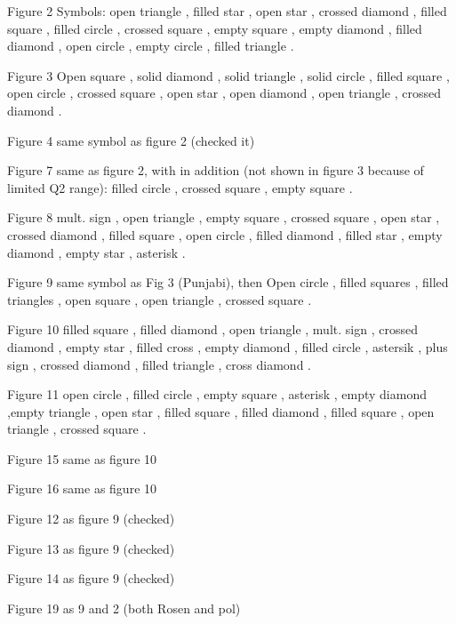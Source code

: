Figure 2
Symbols: open triangle \cite{hand63}, filled star \cite{walker}, 
open star \cite{hanson}, crossed diamond \cite{bartel}, filled square \cite{berger}, filled circle \cite{murphy}, 
crossed square \cite{bork},
empty square \cite{simon}, empty diamond \cite{andivahisA}, filled diamond \cite{litt}, open circle \cite{Price}, 
empty circle \cite{christy}, filled triangle \cite{qattan05}. 

Figure 3
Open square \cite{milbrathA}, solid diamond \cite{pospischil},
 solid triangle \cite{strauch}, solid circle \cite{punjabi05B}, filled square \cite{gayou:2002}, open circle \cite{crawford},
crossed square \cite{paolone:2010}, open star \cite{Jones:2006}, open diamond \cite{hu},  open triangle \cite{Ron:2011}, 
crossed diamond \cite{mac}.

Figure 4
same symbol as figure 2 (checked it)

Figure 7
same as figure 2, with in addition (not shown in figure 3 because of limited Q2 range):
filled circle \cite{murphy}, crossed square \cite{bork}, empty square \cite{simon}.

Figure 8
mult. sign \cite{janssens},  open triangle \cite{hand63}, empty square \cite{coward}, crossed square \cite{bork}, open star \cite{hanson},
crossed diamond \cite{bartel}, filled square \cite{berger}, open circle \cite{Price}, filled diamond \cite{litt}, filled star \cite{walker},
empty diamond \cite{andivahisA}, empty  star \cite{sill}, asterisk \cite{christy}.

Figure 9
same symbol as Fig 3 (Punjabi), then
Open circle \cite{punjabi05B}, filled squares \cite{Puckett:2011}, filled triangles \cite{Puckett:2010}, open square \cite{andivahisB}, 
open triangle \cite{christy}, crossed square \cite{qattan05}.

Figure 10
filled square \cite{eden}, filled diamond \cite{ostrick}, open triangle \cite{herberg}, 
mult. sign \cite{passchier}, crossed diamond \cite{glazier}, empty star \cite{meyerhoff:2004},
filled cross \cite{becker}, empty diamond \cite{golak}, filled circle \cite{bermuth}, astersik \cite{madey},
plus sign \cite{warren}, crossed diamond \cite{geis:2008}, filled triangle \cite{riordan:2001}, cross diamond \cite{schlimme:2013}.

Figure 11
open circle \cite{rock}, filled circle \cite{lung}, empty square \cite{markowitz}, asterisk \cite{anklin94}, 
empty diamond \cite{bruins},empty triangle \cite{anklin98}, open star \cite{gao}, filled square \cite{xu00}, 
filled diamond \cite{kubon02}, filled square \cite{anderson07}, open triangle \cite{lachniet}, crossed square \cite{kohl}.   

Figure 15 same as figure 10

Figure 16 same as figure 10

Figure 12 as figure 9 (checked)

Figure 13 as figure 9 (checked)

Figure 14 as figure 9 (checked)

Figure 19 as 9 and 2 (both Rosen and pol)






